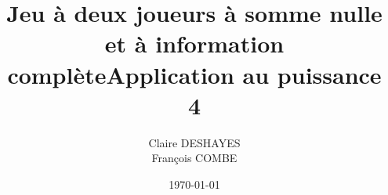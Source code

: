 \documentclass[a4paper,11pt]{article}
\begin{document}
\title {Jeu à deux joueurs à somme nulle et à information complète\n Application au puissance 4}
\author{Claire DESHAYES \\ François COMBE}
\date{\today}
\maketitle
\end{document}
